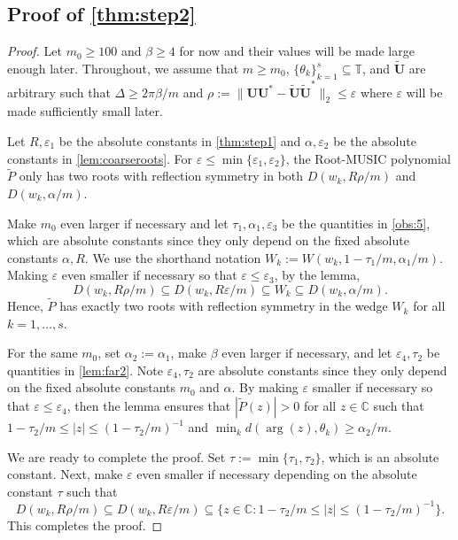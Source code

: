 \documentclass[11pt]{article}
\theoremstyle{definition}
\numberwithin{theorem}{section}
\numberwithin{equation}{section}
\def\C{\mathbb{C}}
\def\T{\mathbb{T}}
\renewcommand{\subset}{\subseteq}
\renewcommand{\tilde}{\widetilde}
\renewcommand{\epsilon}{\varepsilon}
\newcommand{\bfU}{{\boldsymbol U}}
\numberwithin{equation}{section}
\begin{document}
\subsection{Proof of \cref{thm:step2}}
\label{proof:step2}

\begin{proof}
    Let $m_0\geq 100$ and $\beta\geq 4$ for now and their values will be made large enough later. Throughout, we assume that $m\geq m_0$, $\{\theta_k\}_{k=1}^s\subset\T$, and $\tilde\bfU$ are arbitrary such that $\Delta \geq 2\pi \beta/m$ and $\rho:=\|\bfU\bfU^*-\tilde\bfU\tilde\bfU^*\|_2\leq \epsilon$ where $\epsilon$ will be made sufficiently small later. 

        Let $R,\epsilon_1$ be the absolute constants in \cref{thm:step1} and $\alpha,\epsilon_2$ be the absolute constants in \cref{lem:coarseroots}. For $\epsilon\leq \min\{\epsilon_1,\epsilon_2\}$, the Root-MUSIC polynomial $\tilde P$ only has two roots with reflection symmetry in both $D(w_k,R\rho/m)$ and $D(w_k,\alpha/m)$. 
    
        Make $m_0$ even larger if necessary and let $\tau_1,\alpha_1,\epsilon_3$ be the quantities in \cref{obs:5}, which are absolute constants since they only depend on the fixed absolute constants $\alpha, R$. We use the shorthand notation $W_k:=W(w_k,1-\tau_1/m, \alpha_1/m)$. Making $\epsilon$ even smaller if necessary so that $\epsilon\leq \epsilon_3$, by the lemma, 
        $$
        D(w_k,R\rho/m)
        \subset D(w_k,R\epsilon/m)
        \subset W_k
        \subset D(w_k,\alpha/m).
        $$
        Hence, $\tilde P$ has exactly two roots with reflection symmetry in the wedge $W_k$ for all $k=1,\dots,s$. 
    
        For the same $m_0$, set $\alpha_2:=\alpha_1$, make $\beta$ even larger if necessary, and let $\epsilon_4,\tau_2$ be quantities in \cref{lem:far2}. Note $\epsilon_4,\tau_2$ are absolute constants since they only depend on the fixed absolute constants $m_0$ and $\alpha$. By making $\epsilon$ smaller if necessary so that $\epsilon\leq \epsilon_4$, then the lemma ensures that $|\tilde P(z)| >0$ for all $z\in \C$ such that $1-\tau_2/m \leq |z|\leq (1-\tau_2/m)^{-1}$ and $\min_k d(\arg(z),\theta_k)\geq \alpha_2/m$.  
            
    We are ready to complete the proof. Set $\tau := \min\{\tau_1,\tau_2\}$, which is an absolute constant. Next, make $\epsilon$ even smaller if necessary depending on the absolute constant $\tau$ such that 
    $$
    D(w_k,R\rho/m)
    \subset D(w_k,R\epsilon/m)
    \subset \big\{z\in \C \colon 1-\tau_2/m \leq |z|\leq (1-\tau_2/m)^{-1}\big\}. 
    $$
    This completes the proof. 
\end{proof}
\end{document}
